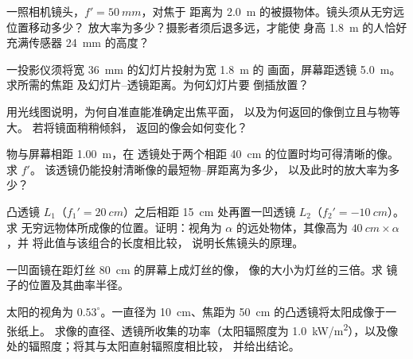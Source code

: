 \begin{exercise}[$\star\star$]\label{exo:b1:mirrors-thin-lenses:6}
一照相机镜头，$f' = \qty{50}{mm}$，对焦于
距离为 \qty{2.0}{m} 的被摄物体。镜头须从无穷远位置移动多少？
放大率为多少？摄影者须后退多远，才能使
身高 \qty{1.8}{m} 的人恰好充满传感器 \qty{24}{mm} 的高度？
\end{exercise}

\begin{exercise}[$\star\star$]\label{exo:b1:mirrors-thin-lenses:7}
一投影仪须将宽 \qty{36}{mm} 的幻灯片投射为宽 \qty{1.8}{m} 的
画面，屏幕距透镜 \qty{5.0}{m}。求所需的焦距
及幻灯片–透镜距离。为何幻灯片要
倒插放置？
\end{exercise}

\begin{exercise}[$\star\star$]\label{exo:b1:mirrors-thin-lenses:8}
用光线图说明，为何自准直能准确定出焦平面，
以及为何返回的像倒立且与物等大。
若将镜面稍稍倾斜，
返回的像会如何变化？
\end{exercise}

\begin{exercise}[$\star\star$]\label{exo:b1:mirrors-thin-lenses:9}
物与屏幕相距 \qty{1.00}{m}，在
透镜处于两个相距 \qty{40}{cm} 的位置时均可得清晰的像。求 $f'$。
该透镜仍能投射清晰像的最短物–屏距离为多少，
以及此时的放大率为多少？
\end{exercise}

\begin{exercise}[$\star\star\star$]\label{exo:b1:mirrors-thin-lenses:10}
凸透镜 $L_1$（$f_1' = \qty{20}{cm}$）之后相距 \qty{15}{cm}
处再置一凹透镜 $L_2$（$f_2' = \qty{-10}{cm}$）。求
无穷远物体所成像的位置。证明：视角为
$\alpha$ 的远处物体，其像高为 $\qty{40}{cm}\times\alpha$，并
将此值与该组合的长度相比较，
说明长焦镜头的原理。
\end{exercise}

\begin{exercise}[$\star\star\star$]\label{exo:b1:mirrors-thin-lenses:11}
一凹面镜在距灯丝 \qty{80}{cm} 的屏幕上成灯丝的像，
像的大小为灯丝的三倍。求
镜子的位置及其曲率半径。
\end{exercise}

\begin{exercise}[$\star\star\star$]\label{exo:b1:mirrors-thin-lenses:12}
太阳的视角为 $0.53^\circ$。一直径为
\qty{10}{cm}、焦距为 \qty{50}{cm} 的凸透镜将太阳成像于一张纸上。
求像的直径、透镜所收集的功率（太阳辐照度为
\qty{1.0}{kW/m^2}），以及像处的辐照度；将其与太阳直射辐照度相比较，
并给出结论。
\end{exercise}

